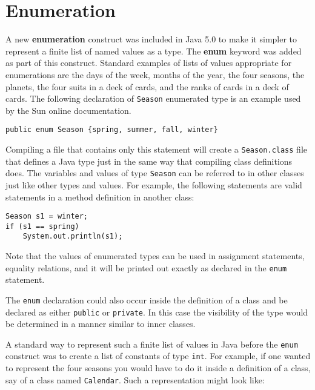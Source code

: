 \section*{Enumeration}
\label{enumeration}
\noindent A new {\bf enumeration} construct was included in Java 5.0 to make 
it simpler to represent a finite list of named values as a type. The
{\bf enum} keyword was added as part of this construct. Standard
examples of lists of values appropriate for enumerations are the days
of the week, months of the year, the four seasons, the planets, the
four suits in a deck of cards, and the ranks of cards in a deck of
cards. The following declaration of {\tt Season} enumerated type is an
example used by the Sun online documentation.

\begin{jjjlisting}
\begin{lstlisting}
public enum Season {spring, summer, fall, winter}
\end{lstlisting}
\end{jjjlisting}

\noindent Compiling a file that contains only this statement will create a
{\tt Season.class} file that defines a Java type just in the same way
that compiling class definitions does.  The variables and values of type
{\tt Season} can be referred to in other classes just like other types and
values. For example, the following statements are valid statements in 
a method definition in another class:

\begin{jjjlisting}
\begin{lstlisting}
Season s1 = winter;
if (s1 == spring)
    System.out.println(s1);    
\end{lstlisting}
\end{jjjlisting}

\noindent Note that the values of enumerated types can be used in 
assignment  statements, equality relations, and it will be printed out exactly
as declared in the {\tt enum} statement.

The {\tt enum} declaration could also occur inside the definition of a
class and be declared as either {\tt public} or {\tt private}. In this case the 
visibility of the type would be determined in a manner similar to inner classes.

A standard way to represent such a finite list of values in Java before the
{\tt enum} construct was to create a list of constants of type {\tt int}.
For example, if one wanted to represent the four seasons you would have to do 
it inside a definition of a class, say of a class named {\tt Calendar}.
Such a representation might look like:

